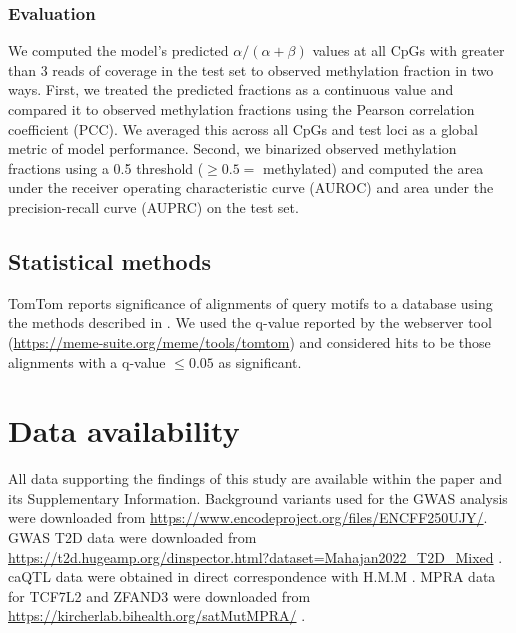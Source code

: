 \subsubsection{Evaluation}

We computed the model's predicted \(\alpha / (\alpha + \beta)\) values at all CpGs with greater than 3 reads of coverage in the test set to observed methylation fraction in two ways. First, we treated the predicted fractions as a continuous value and compared it to observed methylation fractions using the Pearson correlation coefficient (PCC). We averaged this across all CpGs and test loci as a global metric of model performance. Second, we binarized observed methylation fractions using a 0.5 threshold (\(\geq 0.5 =\) methylated) and computed the area under the receiver operating characteristic curve (AUROC) and area under the precision-recall curve (AUPRC) on the test set.

\subsection{Statistical methods}

TomTom reports significance of alignments of query motifs to a database using the methods described in \cite{Gupta2007-zw}. We used the q-value reported by the webserver tool (\url{https://meme-suite.org/meme/tools/tomtom}) and considered hits to be those alignments with a q-value \(\leq 0.05\) as significant.

\section{Data availability}

All data supporting the findings of this study are available within the paper and its Supplementary Information. Background variants used for the GWAS analysis were downloaded from \url{https://www.encodeproject.org/files/ENCFF250UJY/}. GWAS T2D data were downloaded from \url{https://t2d.hugeamp.org/dinspector.html?dataset=Mahajan2022_T2D_Mixed} \cite{Mahajan2022-hu}. caQTL data were obtained in direct correspondence with H.M.M \cite{Mummey2024-kx}. MPRA data for TCF7L2 and ZFAND3 were downloaded from \url{https://kircherlab.bihealth.org/satMutMPRA/} \cite{Kircher2019-di}.

